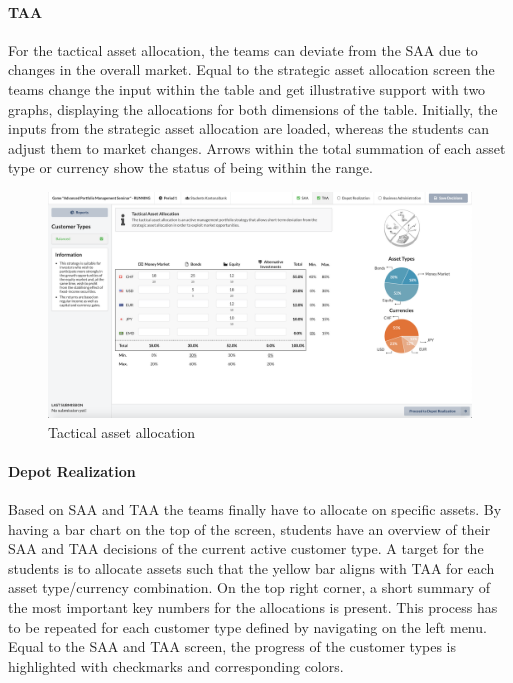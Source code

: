 \paragraph{TAA}
For the tactical asset allocation, the teams can deviate from the SAA due to changes in the overall market. Equal to the strategic asset allocation screen the teams change the input within the table and get illustrative support with two graphs, displaying the allocations for both dimensions of the table. Initially, the inputs from the strategic asset allocation are loaded, whereas the students can adjust them to market changes. Arrows within the total summation of each asset type or currency show the status of being within the range.
\begin{figure}[h!]
  \centering
  \includegraphics[scale=0.2]{img/application-overview/teams/04_taa.png}
  \caption{Tactical asset allocation}
\end{figure}

\paragraph{Depot Realization}
Based on SAA and TAA the teams finally have to allocate on specific assets. By having a bar chart on the top of the screen, students have an overview of their SAA and TAA decisions of the current active customer type. A target for the students is to allocate assets such that the yellow bar aligns with TAA for each asset type/currency combination. On the top right corner, a short summary of the most important key numbers for the allocations is present.
This process has to be repeated for each customer type defined by navigating on the left menu. Equal to the SAA and TAA screen, the progress of the customer types is highlighted with checkmarks and corresponding colors.

